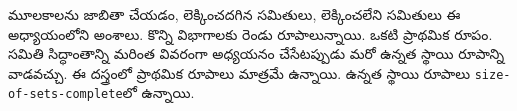 \documentclass[../../../include/open-logic-chapter]{subfiles}
\begin{document}

\begin{editorial}
మూలకాలను జాబితా చేయడం, లెక్కించదగిన సమితులు, లెక్కించలేని సమితులు ఈ అధ్యాయంలోని అంశాలు. కొన్ని విభాగాలకు రెండు రూపాలున్నాయి. ఒకటి ప్రాథమిక రూపం. సమితి సిద్ధాంతాన్ని మరింత వివరంగా అధ్యయనం చేసేటప్పుడు మరో ఉన్నత స్థాయి రూపాన్ని వాడవచ్చు. ఈ దస్త్రంలో ప్రాథమిక రూపాలు మాత్రమే ఉన్నాయి. ఉన్నత స్థాయి రూపాలు \verb|size-of-sets-complete|లో ఉన్నాయి.
\end{editorial}











\OLEndChapterHook
\end{document}
